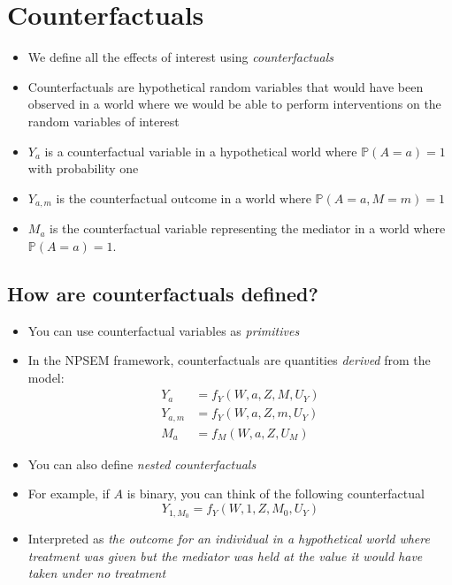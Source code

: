 \documentclass[
  12pt,
]{book}
\providecommand{\tightlist}{%
  \setlength{\itemsep}{0pt}\setlength{\parskip}{0pt}}
\theoremstyle{definition}
\theoremstyle{definition}
\theoremstyle{definition}
\renewcommand{\P}{\mathbb{P}}
\newcommand{\1}{\mathbbm{1}}
\begin{document}
\hypertarget{counterfactuals}{%
\section{Counterfactuals}\label{counterfactuals}}

\begin{itemize}
\tightlist
\item
  We define all the effects of interest using \emph{counterfactuals}
\item
  Counterfactuals are hypothetical random variables that would have been
  observed in a world where we would be able to perform interventions on the
  random variables of interest
\item
  \(Y_a\) is a counterfactual variable in a hypothetical world where \(\P(A=a)=1\)
  with probability one
\item
  \(Y_{a,m}\) is the counterfactual outcome in a world where \(\P(A=a,M=m)=1\)
\item
  \(M_a\) is the counterfactual variable representing the mediator in a world
  where \(\P(A=a)=1\).
\end{itemize}

\hypertarget{how-are-counterfactuals-defined}{%
\subsection{How are counterfactuals defined?}\label{how-are-counterfactuals-defined}}

\begin{itemize}
\tightlist
\item
  You can use counterfactual variables as \emph{primitives}
\item
  In the NPSEM framework, counterfactuals are quantities \emph{derived} from the
  model:
  \begin{align}
    Y_a  &= f_Y(W, a, Z, M, U_Y)\\
    Y_{a,m}  &= f_Y(W, a, Z, m, U_Y)\\
    M_a  &= f_M(W, a, Z, U_M)
  \end{align}
\item
  You can also define \emph{nested counterfactuals}
\item
  For example, if \(A\) is binary, you can think of the following counterfactual
  \begin{equation*}
    Y_{1, M_0} = f_Y(W, 1, Z, M_0, U_Y)
  \end{equation*}
\item
  Interpreted as \emph{the outcome for an individual in a hypothetical world where
  treatment was given but the mediator was held at the value it would have
  taken under no treatment}
\end{itemize}
\end{document}
